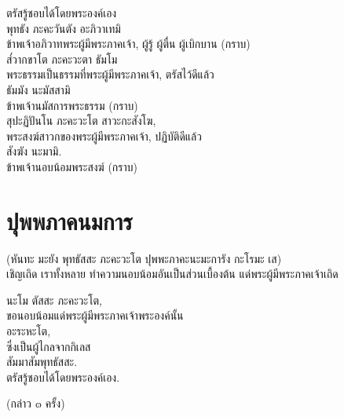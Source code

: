 \documentclass{article}
\begin{document}
ตรัสรู้ชอบได้โดยพระองค์เอง\\
พุทธัง ภะคะวันตัง อะภิวาเทมิ\\
\indent ข้าพเจ้าอภิวาทพระผู้มีพระภาคเจ้า, ผู้รู้ ผู้ตื่น ผู้เบิกบาน (กราบ)\\
ส๎วากขาโต ภะคะวะตา ธัมโม \\
\indent พระธรรมเป็นธรรมที่พระผู้มีพระภาคเจ้า, ตรัสไว้ดีแล้ว\\
ธัมมัง นะมัสสามิ\\
\indent ข้าพเจ้านมัสการพระธรรม (กราบ)\\
สุปะฏิปันโน ภะคะวะโต สาวะกะสังโฆ,\\
\indent พระสงฆ์สาวกของพระผู้มีพระภาคเจ้า, ปฏิบัติดีแล้ว\\
สังฆัง นะมามิ.\\
\indent ข้าพเจ้านอบน้อมพระสงฆ์ (กราบ)

\pagebreak
\section{ปุพพภาคนมการ}
\begin{center}
(หันทะ มะยัง พุทธัสสะ ภะคะวะโต ปุพพะภาคะนะมะการัง กะโรมะ เส)\\
เชิญเถิด เราทั้งหลาย ทำความนอบน้อมอันเป็นส่วนเบื้องต้น แด่พระผู้มีพระภาคเจ้าเถิด
\end{center}
นะโม ตัสสะ ภะคะวะโต,\\
\indent ขอนอบน้อมแด่พระผู้มีพระภาคเจ้าพระองค์นั้น\\
อะระหะโต,\\
\indent ซึ่งเป็นผู้ไกลจากกิเลส\\
สัมมาสัมพุทธัสสะ.\\
\indent ตรัสรู้ชอบได้โดยพระองค์เอง.	
\begin{center}
(กล่าว ๓ ครั้ง)
\end{center}

\pagebreak
\end{document}
